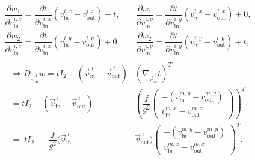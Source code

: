 \begin{proposition}
	\begin{align*}
		\dfrac{\partial w_1}{\partial v_{\text{in}}^{i, x}} = \dfrac{\partial t}{\partial v_{\text{in}}^{i, x}}(v_{\text{in}}^{i, x}- v_{\text{out}}^{i, x}) + t, &\quad 
		\dfrac{\partial w_1}{\partial v_{\text{in}}^{i, y}} = \dfrac{\partial t}{\partial v_{\text{in}}^{i, y}}(v_{\text{in}}^{i, x}- v_{\text{out}}^{i, x}) + 0, \\[0.5em]
		\dfrac{\partial w_2}{\partial v_{\text{in}}^{i, x}} = \dfrac{\partial t}{\partial v_{\text{in}}^{i, x}}(v_{\text{in}}^{i, y}- v_{\text{out}}^{i, y}) + 0, &\quad 
		\dfrac{\partial w_2}{\partial v_{\text{in}}^{i, y}} = \dfrac{\partial t}{\partial v_{\text{in}}^{i, y}}(v_{\text{in}}^{i, y}- v_{\text{out}}^{i, y}) + t, \\[0.5em]
	\end{align*}
	\begin{align*}
		\Rightarrow D_{\vec{v}_{\text{in}}^{\: i}} w = t I_2 + (\vec{v}_{\text{in}}^{\: i} - \vec{v}_{\text{out}}^{\: i}) &(\nabla_{\vec{v}_{\text{in}}^{\: i}} t)^T \\[0.5em]
		= t I_2 + (\vec{v}_{\text{in}}^{\: i} - \vec{v}_{\text{out}}^{\: i}) &\left(\dfrac{f}{g^2} \begin{pmatrix}
			-(v_{\text{in}}^{m, y} - v_{\text{out}}^{m, y}) \\[0.5em]
			v_{\text{in}}^{m, x} - v_{\text{out}}^{m, x}
		\end{pmatrix}\right)^T \\[0.5em]
		= \; t I_2 \:+\: \dfrac{f}{g^2}(\vec{v}_{\text{in}}^{\: i} \;-\; &\vec{v}_{\text{out}}^{\: i}) \begin{pmatrix}
			-(v_{\text{in}}^{m, y} - v_{\text{out}}^{m, y}) \\[0.5em]
			 v_{\text{in}}^{m, x} - v_{\text{out}}^{m, x}
		\end{pmatrix}^T. \\[0.5em]
	\end{align*}

	
\end{proposition}

